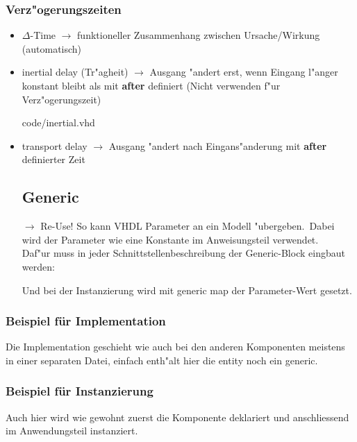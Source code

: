 \begin{multicols}{2}
	\subsubsection{Verz"ogerungszeiten}  %
	\begin{itemize}
		\itemsep0em
		\item $\Delta$-Time $\rightarrow$ funktioneller Zusammenhang 
			zwischen Ursache/Wirkung (automatisch)
		\item inertial delay (Tr"agheit) $\rightarrow$ Ausgang "andert erst, wenn Eingang l"anger konstant bleibt als mit \textbf{after} definiert (Nicht verwenden f"ur Verz"ogerungszeit)
		
				{code/inertial.vhd}
		\item transport delay $\rightarrow$ Ausgang "andert nach Eingans"anderung mit \textbf{after} definierter Zeit 
			
		\vfill\null
		\columnbreak	
		\subsection{Generic}
		$\rightarrow$ Re-Use! So kann VHDL Parameter an ein Modell 
		"ubergeben.\ Dabei wird der Parameter wie eine Konstante im Anweisungsteil verwendet.\\
		Daf"ur muss in jeder Schnittstellenbeschreibung der Generic-Block eingbaut werden:
		
		Und bei der Instanzierung wird mit generic map der Parameter-Wert gesetzt.
	\end{itemize}
\end{multicols}
	
\begin{multicols}{2}


	\subsubsection{Beispiel für Implementation}
	Die Implementation geschieht wie auch bei den anderen 
	Komponenten meistens in einer separaten Datei, einfach enth"alt hier die entity noch ein generic.
	
	\vfill\null
	\columnbreak
	\subsubsection{Beispiel für Instanzierung}
	Auch hier wird wie gewohnt zuerst die Komponente deklariert und 
	anschliessend im Anwendungsteil instanziert.
	
\end{multicols}